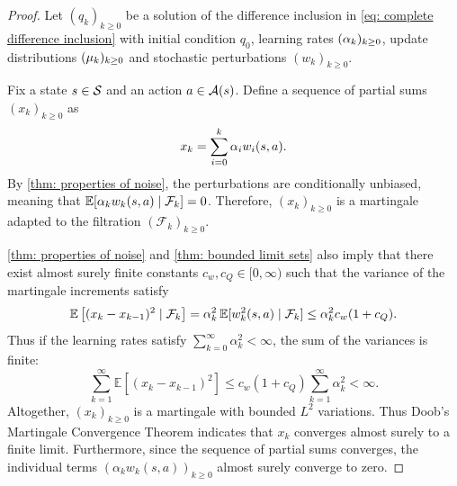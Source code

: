 \begin{proof}
    Let $(q_k)_{k \ge 0}$ be a solution of the difference inclusion in \eqref{eq: complete difference inclusion} with initial condition $q_0$, learning rates $(\alpha_k)_{k \ge 0}$, update distributions $(\mu_k)_{k \ge 0}$ and stochastic perturbations $(w_k)_{k \ge 0}$.
    

    Fix a state $s \in \mathcal{S}$ and an action $a \in \mathcal{A}(s)$.
    Define a sequence of partial sums $(x_k)_{k \ge 0}$ as 
    \begin{align}
        x_k = \sum_{i = 0}^{k} \alpha_{i} w_{i}(s,a) .
    \end{align}
    By \autoref{thm: properties of noise}, the perturbations are conditionally unbiased, meaning that $\mathbb{E}[\alpha_k w_k(s,a) \mid \mathcal{F}_k] = 0$. Therefore, $(x_k)_{k \ge 0}$ is a martingale adapted to the filtration $(\mathcal{F}_{k})_{k \ge 0}$.
    
    \autoref{thm: properties of noise} and \autoref{thm: bounded limit sets} 
    also imply that there exist almost surely finite constants $c_w, c_Q \in [0, \infty)$ such that the variance of the martingale increments satisfy
    \begin{align*}
    \operatorname*{\mathbb{E}} \left[(x_k - x_{k-1})^2 \mid \mathcal{F}_k \right] 
    =
    \alpha_k^2 \operatorname*{\mathbb{E}} [w_k^2(s,a) \mid \mathcal{F}_k] 
    \le \alpha_k^2 c_w(1 + c_Q) .
    \end{align*}
    Thus if the learning rates satisfy $\sum_{k=0}^\infty \alpha_k^2 < \infty$, the sum of the variances is finite:
    \[
    \sum_{k=1}^\infty \mathbb{E}[(x_k - x_{k-1})^2] \le c_w(1 + c_Q) \sum_{k=1}^\infty \alpha_k^2 < \infty .
    \]
    Altogether, $(x_k)_{k \ge 0}$ is a martingale with bounded $L^2$ variations. Thus Doob's Martingale Convergence Theorem indicates that $x_k$ converges almost surely to a finite limit. Furthermore, since the sequence of partial sums converges, the individual terms $(\alpha_k w_k(s,a))_{k \ge 0}$ almost surely converge to zero.
\end{proof}